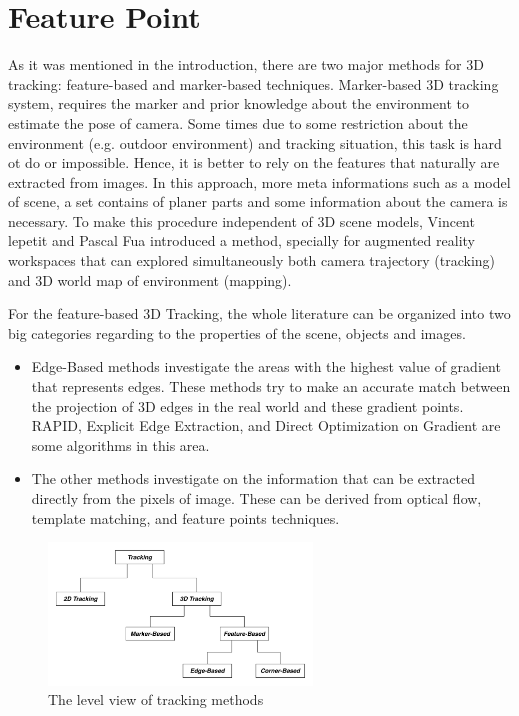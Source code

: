 \chapter{Feature Point}\label{chapter:feature_point}
As it was mentioned in the introduction, there are two major methods for 3D tracking: feature-based and marker-based techniques. Marker-based 3D tracking system, requires the marker and prior knowledge about the environment to estimate the pose of camera. Some times due to some restriction about the environment (e.g. outdoor environment) and tracking situation, this task is hard ot do or impossible. Hence, it is better to rely on the features that naturally are extracted from images. In this approach, more meta informations such as a model of scene, a set contains of planer parts and some information about the camera is necessary. To make this procedure independent of 3D scene models, Vincent lepetit and Pascal Fua \cite{lepetit2005monocular} introduced a method, specially for augmented reality workspaces that can explored simultaneously both camera trajectory (tracking) and 3D world map of environment (mapping).

For the feature-based 3D Tracking, the whole literature can be organized into two big categories regarding to the properties of the scene, objects and images.
\begin{itemize}
\item Edge-Based methods investigate the areas with the highest value of gradient that represents edges. These methods try to make an accurate match between the projection of 3D edges in the real world and these gradient points. RAPID, Explicit Edge Extraction, and Direct Optimization on Gradient are some algorithms in this area. 
\item The other methods investigate on the information that can be extracted directly from the pixels of image. These can be derived from optical flow, template matching, and feature points techniques.
\end{itemize}

\begin{figure}[H]
  \centering
  \includegraphics[width=70mm]{figures/tracking}
  \caption{The level view of tracking methods}\label{fig:tracking}
\end{figure}

